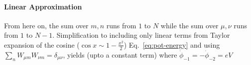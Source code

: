 \documentclass[prx,showpacs,notitlepage,twocolumn,superscriptaddress,nofootinbib,preprintnumbers,floatfix]{revtex4-2}
\begin{document}
\paragraph{Linear Approximation}
From here on, the sum over $m,n$ runs from $1$ to $N$ while the sum over $\mu,\nu$ runs from $1$ to $N-1$. Simplification to including only linear terms from Taylor expansion of the cosine ($\cos{x}\sim 1-\frac{x^2}{2}$) Eq.~\ref{eq:pot-energy} and using $\sum_{n}W_{\mu m}W_{\nu m}=\delta_{\mu\nu}$, yields (upto a constant term)
where $\dot{\phi}_{-1}=-\dot{\phi}_{-2}=eV$
\end{document}

